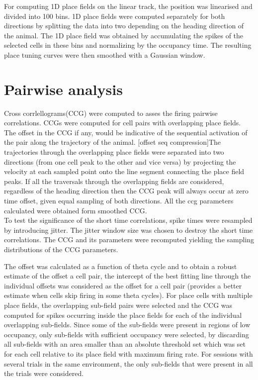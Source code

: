 For computing 1D place fields on the linear track, the position was linearised and divided into 100 bins.
1D place fields were computed separately for both directions by splitting the data into two depending on the heading direction of the animal. The 1D place field was obtained by accumulating the spikes of the selected cells in these bins and normalizing by the occupancy  time. The resulting place tuning curves were then smoothed with a Gaussian window.\\

\section{Pairwise analysis}
Cross corrlellograms(CCG) were computed to asses the firing pairwise correlations. CCGs were computed for cell pairs with overlapping place fields. The offset in the CCG if any, would be indicative of the sequential activation of the pair along the trajectory of the animal. [offset seq compression]The trajectories through the overlapping place fields were separated into two directions (from one cell peak to the other and vice versa) by projecting the velocity at each sampled point onto the line segment connecting the place field peaks. If all the traversals through the overlapping fields are considered, regardless of the heading direction then the CCG peak will always occur at zero time offset, given equal sampling of both directions. All the ccg parameters calculated were obtained form smoothed CCG. \\
To test the significance of the short time correlations, spike times were resampled by introducing jitter. The jitter window size was chosen to destroy the short time correlations. The CCG and its parameters were recomputed yielding the sampling distributions of the CCG parameters.

The offset was calculated as a function of theta cycle and to obtain a robust estimate of the offset a cell pair, the intercept of the best fitting line through the individual offsets was considered as the offset for a cell pair (provides a better estimate when cells skip firing in some theta cycles). For place cells with multiple place fields, the overlapping sub-field pairs were selected and the CCG was computed for spikes occurring inside the place fields for each of the individual overlapping sub-fields. Since some of the sub-fields were present in regions of low occupancy, only sub-fields with sufficient occupancy were selected, by discarding all sub-fields with an area smaller than an absolute threshold set which was set for each cell relative to its place field with maximum firing rate. For sessions with several trials in the same environment, the only sub-fields that were present in all the trials were considered. \\ %


